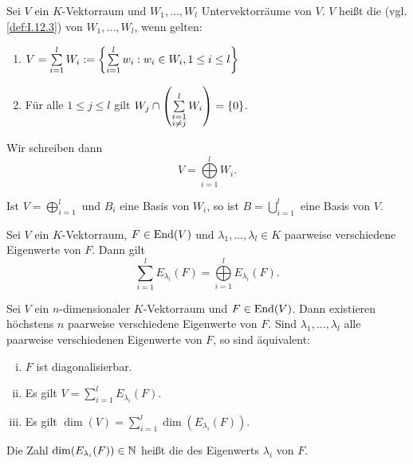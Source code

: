 \begin{definition}
	\label{def:I.16.17}
	Sei $V$ ein $K$-Vektorraum und $W_1,\dots,W_l$ Untervektorräume von $V$.
	$V$ heißt die  (vgl. \autoref{def:I.12.3}) von $W_1,\dots,W_l$, wenn gelten:
	\begin{enumerate}[(1)]
		\item $V = \sum\limits_{i=1}^{l} W_i := \left\{\sum\limits_{i=1}^{l} w_i : w_i \in W_i, 1 \leq i \leq l\right\}$
		\item Für alle $1 \leq j \leq l$ gilt $W_j \cap \left(\sum\limits_{\substack{i = 1 \\ i \neq j}}^{l} W_i\right) = \{0\}$.
	\end{enumerate}
	Wir schreiben dann
	\[
		V = \bigoplus\limits_{i=1}^l W_i.
	\]
\end{definition}

\begin{lemma}
	\label{lemma:I.16.18}
	Ist $V = \bigoplus\limits_{i=1}^{l}$ und $B_i$ eine Basis von $W_i$, so ist $B = \bigcup\limits_{i=1}^{l}$ eine Basis von $V$.
\end{lemma}

\begin{satz}
	\label{satz:I.16.19}
	Sei $V$ ein $K$-Vektorraum, $F \in \operatorname{End}(V)$ und $\lambda_1,\dots,\lambda_l \in K$ paarweise verschiedene Eigenwerte von $F$.
	Dann gilt
	\[
		\sum\limits_{i=1}^l E_{\lambda_i}(F) = \bigoplus\limits_{i=1}^{l} E_{\lambda_i}(F).
	\]
\end{satz}

\begin{satz}
	\label{satz:I.16.20}
	Sei $V$ ein $n$-dimensionaler $K$-Vektorraum und $F \in \operatorname{End}(V)$.
	Dann existieren höchstens $n$ paarweise verschiedene Eigenwerte von $F$.
	Sind $\lambda_1,\dots,\lambda_l$ alle paarweise verschiedenen Eigenwerte von $F$, so sind äquivalent:
	\begin{enumerate}[(i)]
		\item $F$ ist diagonalisierbar.
		\item Es gilt $V = \sum\limits_{i=1}^{l} E_{\lambda_i}(F)$.
		\item Es gilt $\dim(V) = \sum\limits_{i=1}^l \dim(E_{\lambda_i}(F))$.
	\end{enumerate}
\end{satz}

\begin{definition}
	\label{def:I.16.21}
	Die Zahl $\dim(E_{\lambda_i}(F)) \in \mathbb{N}$ heißt die  des Eigenwerts $\lambda_i$ von $F$.
\end{definition}